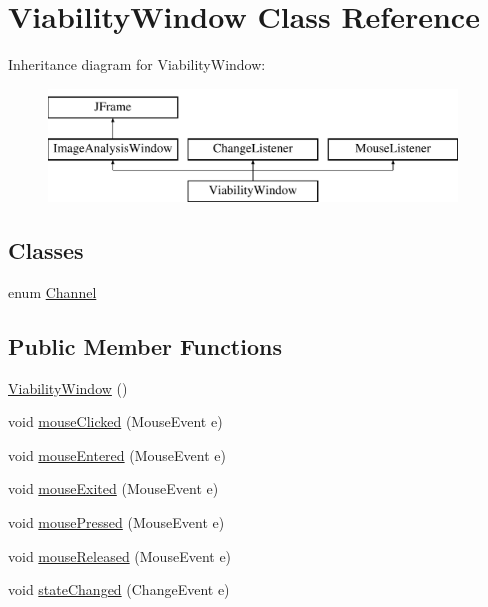 \hypertarget{classgui_1_1_viability_window}{}\section{Viability\+Window Class Reference}
\label{classgui_1_1_viability_window}
Inheritance diagram for Viability\+Window\+:\begin{figure}[H]
\begin{center}
\leavevmode
\includegraphics[height=3.000000cm]{classgui_1_1_viability_window}
\end{center}
\end{figure}
\subsection*{Classes}
\begin{DoxyCompactItemize}
\item 
enum \hyperlink{enumgui_1_1_viability_window_1_1_channel}{Channel}
\end{DoxyCompactItemize}
\subsection*{Public Member Functions}
\begin{DoxyCompactItemize}
\item 
\hyperlink{classgui_1_1_viability_window_a9352db24ec12b97781c0ca61f2938a00}{Viability\+Window} ()
\item 
void \hyperlink{classgui_1_1_viability_window_a45d56bd84238e8b56589dfc732e2b2cf}{mouse\+Clicked} (Mouse\+Event e)
\item 
void \hyperlink{classgui_1_1_viability_window_a74e5095765312765f33ed268095a2cb2}{mouse\+Entered} (Mouse\+Event e)
\item 
void \hyperlink{classgui_1_1_viability_window_aa14a60f36cdd6abc1d90ce56d39218eb}{mouse\+Exited} (Mouse\+Event e)
\item 
void \hyperlink{classgui_1_1_viability_window_aed82e1ce3dd3cf283d508c3ba3be70ef}{mouse\+Pressed} (Mouse\+Event e)
\item 
void \hyperlink{classgui_1_1_viability_window_a87a07291794e15052db67f945d90853e}{mouse\+Released} (Mouse\+Event e)
\item 
void \hyperlink{classgui_1_1_viability_window_a3b3c478bccdb239125dd466aa738834e}{state\+Changed} (Change\+Event e)
\end{DoxyCompactItemize}

